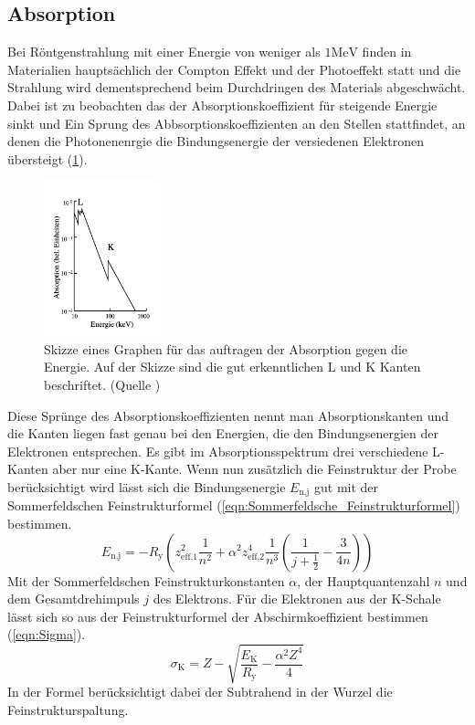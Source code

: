\subsection{Absorption}
Bei Röntgenstrahlung mit einer Energie von weniger als $1 \text{MeV}$ finden in Materialien hauptsächlich der Compton Effekt und der Photoeffekt statt und die Strahlung wird dementsprechend beim Durchdringen des Materials abgeschwächt.
Dabei ist zu beobachten das der Absorptionskoeffizient für steigende Energie sinkt und Ein Sprung des Abbsorptionskoeffizienten an den Stellen stattfindet, an denen die Photonenenrgie die Bindungsenergie der versiedenen Elektronen übersteigt (\ref{fig:Absorption}).
\begin{figure}
    \centering
    \includegraphics[width=0.3\textwidth]{bilder/Absorption.png}
    \caption{Skizze eines Graphen für das auftragen der Absorption gegen die Energie. Auf der Skizze sind die gut erkenntlichen L und K Kanten beschriftet. (Quelle \cite{Anleitung})}
    \label{fig:Absorption}
\end{figure}
Diese Sprünge des Absorptionskoeffizienten nennt man Absorptionskanten und die Kanten liegen fast genau bei den Energien, die den Bindungsenergien der Elektronen entsprechen.
Es gibt im Absorptionsspektrum  drei verschiedene L-Kanten aber nur eine K-Kante.
Wenn nun zusätzlich die Feinstruktur der Probe berücksichtigt wird lässt sich die Bindungsenergie $E_{\text{n,j}}$ gut mit der Sommerfeldschen Feinstrukturformel (\ref{eqn:Sommerfeldsche_Feinstrukturformel}) bestimmen.
\begin{equation}
    E_{\text{n,j}} = -R_{\text{y}}\left(z_{\text{eff,}1}^2\frac{1}{n^2}+\alpha^2z_{\text{eff,}2}^4\frac{1}{n^3}\left(\frac{1}{j+\frac{1}{2}}-\frac{3}{4n}\right) \right)     \label{eqn:Sommerfeldsche_Feinstrukturformel}
\end{equation}
Mit der Sommerfeldschen Feinstrukturkonstanten $\alpha$, der Hauptquantenzahl $n$ und dem Gesamtdrehimpuls $j$ des Elektrons.
Für die Elektronen aus der K-Schale lässt sich so aus der Feinstrukturformel der Abschirmkoeffizient bestimmen (\ref{eqn:Sigma}).
\begin{equation}
    \sigma_{\text{K}} = Z - \sqrt{\frac{E_{\text{K}}}{R_{\text{y}}}-\frac{\alpha^2Z^4}{4}} \label{eqn:Sigma}
\end{equation}
In der Formel berücksichtigt dabei der Subtrahend in der Wurzel die Feinstrukturspaltung.

